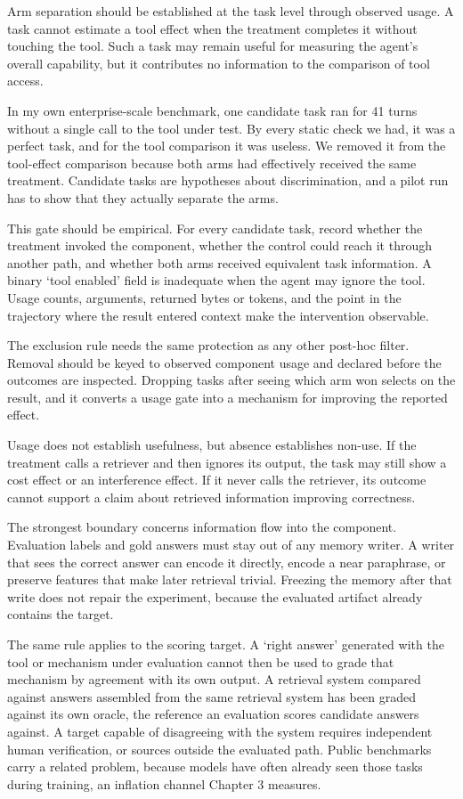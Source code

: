 Arm separation should be established at the task level through observed usage. A task cannot estimate a tool effect when the treatment completes it without touching the tool. Such a task may remain useful for measuring the agent's overall capability, but it contributes no information to the comparison of tool access.

In my own enterprise-scale benchmark, one candidate task ran for 41 turns without a single call to the tool under test. By every static check we had, it was a perfect task, and for the tool comparison it was useless. We removed it from the tool-effect comparison because both arms had effectively received the same treatment. Candidate tasks are hypotheses about discrimination, and a pilot run has to show that they actually separate the arms.

This gate should be empirical. For every candidate task, record whether the treatment invoked the component, whether the control could reach it through another path, and whether both arms received equivalent task information. A binary `tool enabled' field is inadequate when the agent may ignore the tool. Usage counts, arguments, returned bytes or tokens, and the point in the trajectory where the result entered context make the intervention observable.

The exclusion rule needs the same protection as any other post-hoc filter. Removal should be keyed to observed component usage and declared before the outcomes are inspected. Dropping tasks after seeing which arm won selects on the result, and it converts a usage gate into a mechanism for improving the reported effect.

Usage does not establish usefulness, but absence establishes non-use. If the treatment calls a retriever and then ignores its output, the task may still show a cost effect or an interference effect. If it never calls the retriever, its outcome cannot support a claim about retrieved information improving correctness.

The strongest boundary concerns information flow into the component. Evaluation labels and gold answers must stay out of any memory writer. A writer that sees the correct answer can encode it directly, encode a near paraphrase, or preserve features that make later retrieval trivial. Freezing the memory after that write does not repair the experiment, because the evaluated artifact already contains the target.

The same rule applies to the scoring target. A `right answer' generated with the tool or mechanism under evaluation cannot then be used to grade that mechanism by agreement with its own output. A retrieval system compared against answers assembled from the same retrieval system has been graded against its own oracle, the reference an evaluation scores candidate answers against. A target capable of disagreeing with the system requires independent human verification, or sources outside the evaluated path. Public benchmarks carry a related problem, because models have often already seen those tasks during training, an inflation channel Chapter 3 measures.

